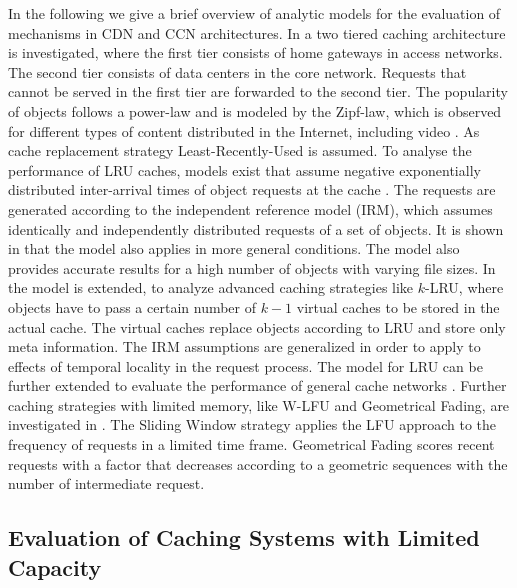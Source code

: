 In the following we give a brief overview of analytic models for the evaluation of mechanisms in CDN and CCN architectures.
In \cite{fricker2012impact} a two tiered caching architecture is investigated, where the first tier consists of home gateways in access networks.
The second tier consists of data centers in the core network.
Requests that cannot be served in the first tier are forwarded to the second tier.
The popularity of objects follows a power-law and is modeled by the Zipf-law, which is observed for different types of content distributed in the Internet, including video \cite{gill2007youtube,cha2009analyzing}.
As cache replacement strategy Least-Recently-Used is assumed.
To analyse the performance of LRU caches, models exist that assume negative exponentially distributed inter-arrival times of object requests at the cache \cite{che2002hierarchical}.
The requests are generated according to the independent reference model (IRM), which assumes identically and independently distributed requests of a set of objects.
It is shown in \cite{fricker2012versatile} that the model also applies in more general conditions.
The model also provides accurate results for a high number of objects with varying file sizes.
In \cite{martina2014unified} the model is extended, to analyze advanced caching strategies like {$k$-LRU}, where objects have to pass a certain number of $k-1$ virtual caches to be stored in the actual cache.
The virtual caches replace objects according to LRU and store only meta information.
The IRM assumptions are generalized in order to apply to effects of temporal locality in the request process.
The model for LRU can be further extended to evaluate the performance of general cache networks \cite{rosensweig2010approximate, martina2014unified}.
Further caching strategies with limited memory, like W-LFU and Geometrical Fading, are investigated in \cite{hasslinger2014caching}.
The Sliding Window strategy applies the LFU approach to the frequency of requests in a limited time frame.
Geometrical Fading scores recent requests with a factor that decreases according to a geometric sequences with the number of intermediate request.

\subsection{Evaluation of Caching Systems with Limited Capacity}

